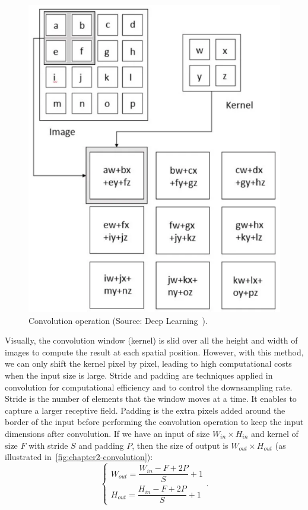 \begin{figure}[h!]
    \centering
    \includegraphics[width=0.5\linewidth]{content/resources/images/background/convolution-compute.png}
    \caption{Convolution operation (Source: Deep Learning~\cite{Goodfellow-MIT2016-DL}).}
    \label{fig:chapter2-convolution-compute}
\end{figure}

Visually, the convolution window (kernel) is slid over all the height and width of images to compute the result at each spatial position. However, with this method, we can only shift the kernel pixel by pixel, leading to high computational costs when the input size is large. Stride and padding are techniques applied in convolution for computational efficiency and to control the downsampling rate. Stride is the number of elements that the window moves at a time. It enables to capture a larger receptive field. Padding is the extra pixels added around the border of the input before performing the convolution operation to keep the input dimensions after convolution. If we have an input of size $W_{in} \times H_{in}$ and kernel of size $F$ with stride $S$ and padding $P$, then the size of output is $W_{out} \times H_{out}$ (as illustrated in~\autoref{fig:chapter2-convolution}):
\begin{equation}
    \begin{cases} 
        W_{out} = \dfrac{W_{in} - F + 2P}{S} + 1 \\ 
        H_{out} = \dfrac{H_{in} - F + 2P}{S} + 1 
    \end{cases}.
\end{equation}

